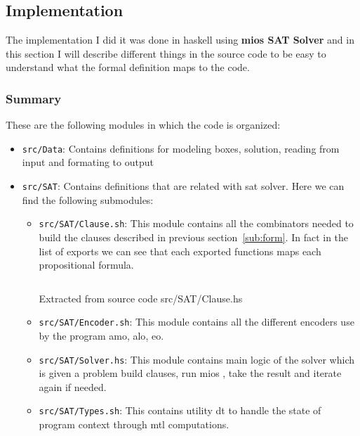 \documentclass[12pt, a4paper]{article}
\begin{document}
\subsection{Implementation}
The implementation I did it was done in \acrfull{haskell} using \textbf{mios SAT Solver} \cite{mios} and in this section I will describe different things in the source code to be easy to understand what the formal definition maps to the code.

\subsubsection{Summary}
These are the following modules in which the code is organized:

\begin{itemize}
  \item \texttt{src/Data}: Contains definitions for modeling boxes, solution, reading from input and formating to output
  \item \texttt{src/SAT}: Contains definitions that are related with \acrshort{sat} solver. Here we can find the following submodules:
    \begin{itemize}
      \item \texttt{src/SAT/Clause.sh}: This module contains all the combinators needed to build the clauses described in previous section~\ref{sub:form}. In fact in the list of exports we can see that each exported functions maps each propositional formula.
          \begin{listing}[H]
            \inputminted[firstline=13, lastline=18, linenos, breaklines]{haskell}{../src/SAT/Clause.hs}
            \caption{Extracted from source code src/SAT/Clause.hs}
            \label{src:sat:1}
          \end{listing}
        \item \texttt{src/SAT/Encoder.sh}: This module contains all the different encoders use by the program \acrfull{amo}, \acrfull{alo}, \acrfull{eo}.
        \item \texttt{src/SAT/Solver.hs}: This module contains main logic of the solver which is given a problem build clauses, run mios \cite{mios}, take the result and iterate again if needed.
        \item \texttt{src/SAT/Types.sh}: This contains utility \acrfull{dt} to handle the state of program context through \acrfull{mtl}\cite{mtl} computations.
    \end{itemize}
\end{itemize}
\end{document}
